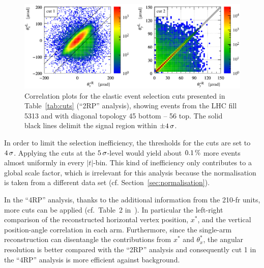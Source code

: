 \begin{figure}
\begin{center}
\includegraphics{fig/cut_example.pdf}
\caption{%
Correlation plots for the elastic event selection cuts presented in Table~\ref{tab:cuts} (``2RP'' analysis), showing events from the LHC fill 5313 and with diagonal topology 45 bottom -- 56 top. The solid black lines delimit the signal region within $\pm 4\,{\rm \sigma}$.
}
\label{fig:cuts}
\end{center}
\end{figure}

In order to limit the selection inefficiency, the thresholds for the cuts are set to $4\,{\rm \sigma}$. Applying the cuts at the $5\,{\rm \sigma}$-level would yield about $0.1\,{\rm \%}$ more events almost uniformly in every $|t|$-bin. This kind of inefficiency only contributes to a global scale factor, which is irrelevant for this analysis because the normalisation is taken from a different data set (cf. Section~\ref{sec:normalisation}).

In the ``4RP'' analysis, thanks to the additional information from the 210-fr units, more cuts can be applied (cf.~Table~2 in~\cite{totem-7tev-el}). In particular the left-right comparison of the reconstructed horizontal vertex position, $x^*$, and the vertical position-angle correlation in each arm. Furthermore, since the single-arm reconstruction can disentangle the contributions from $x^*$ and $\theta^*_x$, the angular resolution is better compared with the ``2RP'' analysis and consequently cut 1 in the ``4RP'' analysis is more efficient against background.






